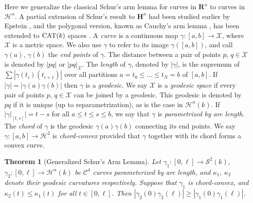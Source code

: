 \documentclass[11pt]{amsart}
\newtheorem{theorem}{Theorem}[section]
\theoremstyle{definition}
\newcommand{\R}{\mathbf{R}}
\newcommand{\C}{\mathcal{C}}
\begin{document}
Here we generalize the classical Schur's arm lemma for curves in $\R^n$ \cite{chern1967,sullivan2008} to curves in $\mathcal{H}^n$. A partial extension of Schur's result to $\textbf{H}^n$ had been studied earlier by Epstein \cite{epstein1985}, and the polygonal version, known as Cauchy's arm lemma \cite{aigner-ziegler1999}, has been extended to $\textup{CAT}(k)$ spaces \cite{akp2019}. A \emph{curve} is a continuous map  $\gamma\colon [a,b]\to \mathcal{X}$, where $\mathcal{X}$ is a metric space. We also use $\gamma$ to refer to its image $\gamma([a,b])$, and call $\gamma(a)$, $\gamma(b)$ the \emph{end points} of $\gamma$.  The distance between a pair of points $p$, $q\in \mathcal{X}$ is denoted by $|pq|$ or $|pq|_{\mathcal{X}}$. The \emph{length} of $\gamma$, denoted by $|\gamma|$, is the supremum of $\sum|\gamma(t_i)(t_{i+1})|$ over all partitions $a=t_0\leq \dots \leq t_N=b$ of $[a,b]$. If $|\gamma|=|\gamma(a)\gamma(b)|$ then $\gamma$ is a \emph{geodesic}. We say $\mathcal{X}$ is a \emph{geodesic space} if every pair of points $p$, $q\in \mathcal{X}$ can be joined by a geodesic. This geodesic is denoted by $pq$ if it is unique (up to reparametrization), as is the case in $\mathcal{H}^n(k)$. If $|\gamma|_{[t,s]}|=t-s$ for all $a\leq t\leq s\leq b$, we say that $\gamma$ is \emph{parametrized by arc length}. The \emph{chord} of $\gamma$ is the geodesic $\gamma(a)\gamma(b)$ connecting its end points. We say $\gamma\colon[a,b]\to \mathcal{H}^2$  is \emph{chord-convex} provided that $\gamma$  together with its chord forms a convex curve. 

\begin{theorem}[Generalized Schur's Arm Lemma]\label{thm:schur}
Let $\gamma_1\colon [0,\ell]\to\mathcal{S}^2(k)$, $\gamma_2\colon [0,\ell]\to\mathcal{H}^n(k)$ be $\C^4$ curves parameterized by arc length, and $\kappa_1$, $\kappa_2$ denote their geodesic curvatures  respectively.  Suppose that $\gamma_1$ is chord-convex, and $\kappa_2(t)\leq\kappa_1(t)$ for all $t\in[0,\ell]$. Then $|\gamma_2(0)\gamma_2(\ell)|\geq |\gamma_1(0)\gamma_1(\ell)|$. 
\end{theorem}
\end{document}
